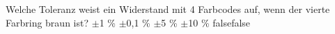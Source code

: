     {Welche Toleranz weist ein Widerstand mit 4 Farbcodes auf, wenn der vierte Farbring braun ist?}
    {$±$1 \%}
    {$±$0,1 \%}
    {$±$5 \%}
    {$±$10 \%}
    {false}{false}